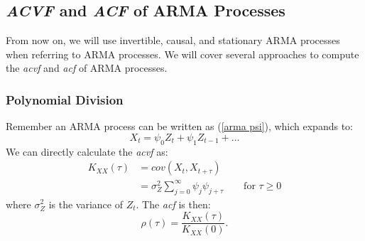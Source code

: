 \documentclass{article}
\begin{document}
\subsection{\emph{ACVF} and \emph{ACF} of ARMA Processes}
From now on, we will use invertible, causal, and stationary ARMA processes when referring to ARMA processes. We will cover several approaches to compute the \emph{acvf} and \emph{acf} of ARMA processes.
\subsubsection{Polynomial Division}
Remember an ARMA process can be written as (\ref{arma psi}), which expands to:
\begin{equation}\label{arma psi expanded}
    X_t = \psi_0 Z_t + \psi_1 Z_{t-1} + \ldots
\end{equation}
We can directly calculate the \emph{acvf} as:
\begin{align}\label{arma acvf direct}
    K_{XX}(\tau)&=cov(X_t, X_{t+\tau})\nonumber\\
    &=\sigma_Z^2 \sum_{j=0}^{\infty} \psi_j \psi_{j+\tau} \qquad \text{for } \tau \geq 0
\end{align}
where $\sigma_Z^2$ is the variance of $Z_t$. The \emph{acf} is then:
\begin{equation}
    \rho(\tau) = \frac{K_{XX}(\tau)}{K_{XX}(0)}.
\end{equation}
\end{document}
